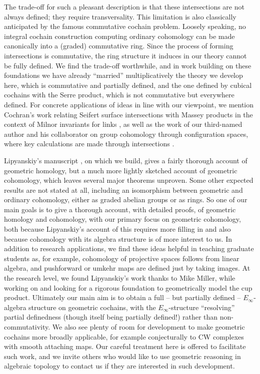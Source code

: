 The trade-off for such a pleasant description is that these intersections are not always defined; they require transversality.
This limitation is also classically anticipated by the famous commutative cochain problem.
Loosely speaking, no integral cochain construction computing ordinary cohomology can be made canonically into a (graded) commutative ring.
Since the process of forming intersections is commutative, the ring structure it induces in our theory cannot be fully defined.
We find the trade-off worthwhile, and in work building on these foundations \cite{FMS-flows} we have already ``married'' multiplicatively the theory we develop here, which is commutative and partially defined, and the one defined by cubical cochains with the Serre product, which is not commutative but everywhere defined.
For concrete applications of ideas in line with our viewpoint, we mention Cochran's work relating Seifert surface intersections with Massey products in the context of Milnor invariants for links \cite{cochran1990milnor}, as well as the work of our third-named author and his collaborator on group cohomology through configuration spaces, where key calculations are made through intersections \cite{giusti2012symmetric, giusti2021alternating}.

Lipyanskiy's manuscript \cite{Lipy14}, on which we build, gives a fairly thorough account of geometric homology, but a much more lightly sketched account of geometric cohomology, which leaves several major theorems unproven.
Some other expected results are not stated at all, including an isomorphism between geometric and ordinary cohomology, either as graded abelian groups or as rings.
So one of our main goals is to give a thorough account, with detailed proofs, of geometric homology and cohomology, with our primary focus on geometric cohomology, both because Lipyanskiy's account of this requires more filling in and also because cohomology with its algebra structure is of more interest to us.
In addition to research applications, we find these ideas helpful in teaching graduate students as, for example, cohomology of projective spaces follows from linear algebra, and pushforward or umkehr maps are defined just by taking images.
At the research level, we found Lipyanskiy's work thanks to Mike Miller, while working on \cite{FMS-flows} and looking for a rigorous foundation to geometrically model the cup product.
Ultimately our main aim is to obtain a full -- but partially defined -- $E_\infty$-algebra structure on geometric cochains, with the $E_\infty$-structure ``resolving'' partial definedness (though itself being partially defined!) rather than non-commutativity.
We also see plenty of room for development to make geometric cochains more broadly applicable, for example conjecturally to CW complexes with smooth attaching maps.
Our careful treatment here is offered to facilitate such work, and we invite others who would like to use geometric reasoning in algebraic topology to contact us if they are interested in such development.

